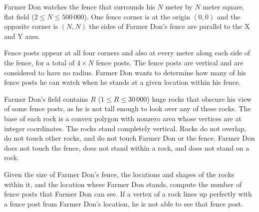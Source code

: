Farmer Don watches the fence that surrounds his $N$ meter by $N$ meter square, flat field ($2 \leq N \leq 500\,000$). One fence corner is at the origin $(0, 0)$ and the opposite corner is  $(N, N)$ the sides of Farmer Don's fence are parallel to the X and Y axes.

Fence posts appear at all four corners and also at every meter along each side of the fence, for a total of $4\times N$ fence posts. The fence posts are vertical and are considered  to have no radius. Farmer Don wants to determine how many of his fence posts he can watch when he stands at a given location within his fence.

Farmer Don's field contains $R$ ($1 \leq R \leq 30\,000$) huge rocks that obscure his view of some fence posts, as he is not tall enough to look over any of these rocks. The base of  each rock is a convex polygon with nonzero area whose vertices are at integer coordinates. The rocks stand completely vertical. Rocks do not overlap, do not touch other rocks, and do not touch Farmer Don or the fence. Farmer Don does not touch the fence, does not stand within a rock, and does not stand on a rock.

Given the size of Farmer Don's fence, the locations and shapes of the rocks within it, and the location where Farmer Don stands, compute the number of fence posts that  Farmer Don can see. If a vertex of a rock lines up perfectly with a fence post from Farmer Don's location, he is not able to see that fence post. 